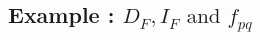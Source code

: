 \documentclass[mathserif,10pt]{beamer}
\newcommand{\cmt}[1]{}
\newcommand{\p}{\ensuremath{p}}
\newcommand{\q}{\ensuremath{q}}
\newcommand{\f}{\ensuremath{f}}
\newcommand{\heap}{\ensuremath{\mathcal{H}}}
\newcommand{\fields}{\ensuremath{\mathcal{F}}}
\newcommand{\false}{\textbf{False}}
\newcommand{\true}{\textbf{True}}
\begin{document}
%     
% 

\subsection{Example : $D_F ,I_F \mbox{ and }  f_{pq}$}
\frame
{
	\frametitle{\subsecname}
	
}
\end{document}
